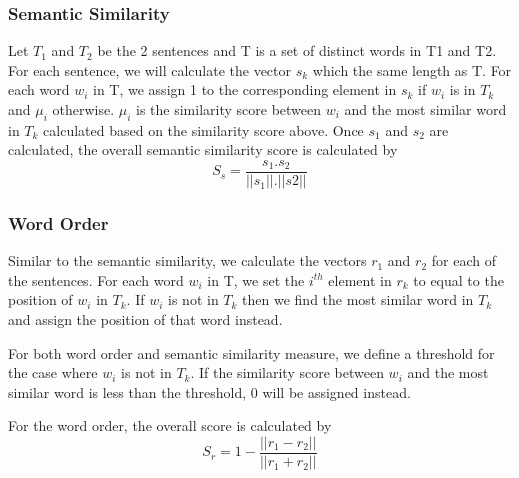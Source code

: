\subsubsection{Semantic Similarity}
Let $T_1$ and $T_2$ be the 2 sentences and T is a set of distinct words in T1 and T2. For each sentence, we will calculate the vector $s_k$ which the same length as T. For each word $w_i$ in T, we assign 1 to the corresponding element in $s_k$ if $w_i$ is in $T_k$ and $\mu_i$ otherwise. $\mu_i$ is the similarity score between $w_i$ and the most similar word in $T_k$ calculated based on the similarity score above. Once $s_1$ and $s_2$ are calculated, the overall semantic similarity score is calculated by 
\begin{equation*}
	S_s = \frac{s_1. s_2}{||s_1||.||s2||}
\end{equation*}

\subsubsection{Word Order}
Similar to the semantic similarity, we calculate the vectors $r_1$ and $r_2$ for each of the sentences. For each word $w_i$ in T, we set the $i^{th}$ element in $r_k$ to equal to the position of $w_i$ in $T_k$. If $w_i$ is not in $T_k$ then we find the most similar word in $T_k$ and assign the position of that word instead.

For both word order and semantic similarity measure, we define a threshold for the case where $w_i$ is not in $T_k$. If the similarity score between $w_i$ and the most similar word is less than the threshold, 0 will be assigned instead.

For the word order, the overall score is calculated by 
\begin{equation*}
	S_r = 1 - \frac{||r_1 - r_2||}{||r_1 + r_2||}
\end{equation*}